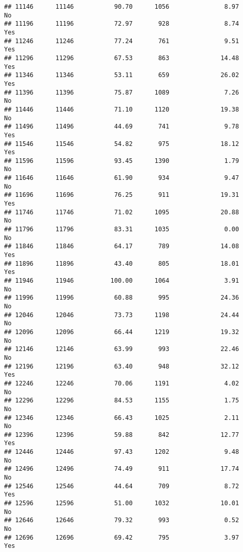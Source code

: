 \documentclass[
]{article}
\begin{document}
\begin{verbatim}
## 11146      11146           90.70      1056               8.97                No
## 11196      11196           72.97       928               8.74               Yes
## 11246      11246           77.24       761               9.51               Yes
## 11296      11296           67.53       863              14.48               Yes
## 11346      11346           53.11       659              26.02               Yes
## 11396      11396           75.87      1089               7.26                No
## 11446      11446           71.10      1120              19.38                No
## 11496      11496           44.69       741               9.78               Yes
## 11546      11546           54.82       975              18.12               Yes
## 11596      11596           93.45      1390               1.79                No
## 11646      11646           61.90       934               9.47                No
## 11696      11696           76.25       911              19.31               Yes
## 11746      11746           71.02      1095              20.88                No
## 11796      11796           83.31      1035               0.00                No
## 11846      11846           64.17       789              14.08               Yes
## 11896      11896           43.40       805              18.01               Yes
## 11946      11946          100.00      1064               3.91                No
## 11996      11996           60.88       995              24.36                No
## 12046      12046           73.73      1198              24.44                No
## 12096      12096           66.44      1219              19.32                No
## 12146      12146           63.99       993              22.46                No
## 12196      12196           63.40       948              32.12               Yes
## 12246      12246           70.06      1191               4.02                No
## 12296      12296           84.53      1155               1.75                No
## 12346      12346           66.43      1025               2.11                No
## 12396      12396           59.88       842              12.77               Yes
## 12446      12446           97.43      1202               9.48                No
## 12496      12496           74.49       911              17.74                No
## 12546      12546           44.64       709               8.72               Yes
## 12596      12596           51.00      1032              10.01                No
## 12646      12646           79.32       993               0.52                No
## 12696      12696           69.42       795               3.97               Yes

\end{verbatim}
\end{document}
